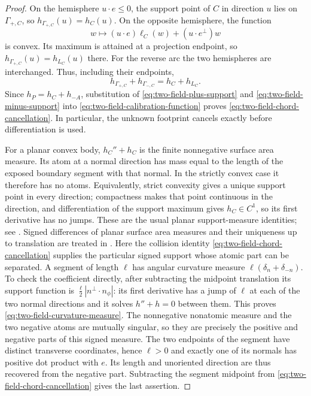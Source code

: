 \begin{proof}
On the hemisphere $u\cdot e\le0$, the support point of $C$ in
direction $u$ lies on $\Gamma_{+,C}$, so
$h_{\Gamma_{+,C}}(u)=h_C(u)$.  On the opposite hemisphere,
the function
\[
 w\longmapsto (u\cdot e)\ell_C(w)+(u\cdot e^\perp)w
\]
is convex.  Its maximum is attained at a projection endpoint,
so $h_{\Gamma_{+,C}}(u)=h_{L_C}(u)$ there.
For the reverse arc the two hemispheres are interchanged.
Thus, including their endpoints,
\begin{equation}\label{eq:two-field-arc-sum}
              h_{\Gamma_{+,C}}+h_{\Gamma_{-,C}}
                                      =h_C+h_{L_C}.
\end{equation}
Since $h_P=h_C+h_{-A}$, substitution of
\eqref{eq:two-field-plus-support} and
\eqref{eq:two-field-minus-support} into
\eqref{eq:two-field-calibration-function} proves
\eqref{eq:two-field-chord-cancellation}.  In particular, the unknown
footprint cancels exactly before differentiation is used.

For a planar convex body, $h_C''+h_C$ is the finite nonnegative
surface area measure.  Its atom at a normal direction has mass
equal to the length of the exposed boundary segment with that
normal.  In the strictly convex case it therefore has no atoms.
Equivalently, strict convexity gives a unique support point in
every direction; compactness makes that point continuous in the
direction, and differentiation of the support maximum gives
$h_C\in C^1$, so its first derivative has no jumps.  These are
the usual planar support-measure identities; see \cite{Schneider}. Signed differences of planar surface area
measures and their uniqueness up to translation are treated in
\cite[Section~4]{MartinezMaure}. Here the collision identity
\eqref{eq:two-field-chord-cancellation} supplies the particular
signed support whose atomic part can be separated.
A segment of length
$\ell$ has angular curvature measure
$\ell(\delta_n+\delta_{-n})$.  To check the coefficient directly,
after subtracting the midpoint translation its support function is
$\frac\ell2|n^\perp\cdot n_\phi|$: its first derivative has a
jump of $\ell$ at each of the two normal directions and it solves
$h''+h=0$ between them.
This proves \eqref{eq:two-field-curvature-measure}.
The nonnegative nonatomic measure and the two negative atoms are
mutually singular, so they are precisely the positive and negative
parts of this signed measure.  The two endpoints of the segment
have distinct transverse coordinates, hence $\ell>0$ and exactly
one of its normals has positive dot product with $e$.
Its length and unoriented direction are thus recovered from the
negative part.  Subtracting the segment midpoint from
\eqref{eq:two-field-chord-cancellation} gives the last assertion.
\end{proof}

